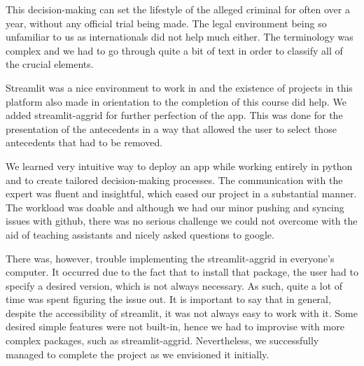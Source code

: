 \documentclass{article}
\begin{document}
This decision-making can set the lifestyle of the alleged criminal for often over a year, without any official trial being made. The legal environment being so unfamiliar to us as internationals did not help much either. The terminology was complex and we had to go through quite a bit of text in order to classify all of the crucial elements.

Streamlit was a nice environment to work in and the existence of projects in this platform also made in orientation to the completion of this course did help. We added streamlit-aggrid for further perfection of the app. This was done for the presentation of the antecedents in a  way that allowed the user to select those antecedents that had to be removed.  %

We learned very intuitive way to deploy an app while working entirely in python and to create tailored decision-making processes. The communication with the expert was fluent and insightful, which eased our project in a substantial manner. The workload was doable and although we had our minor pushing and syncing issues with github, there was no serious challenge we could not overcome with the aid of teaching assistants and nicely asked questions to google.

There was, however, trouble implementing the streamlit-aggrid in everyone's computer. It occurred due to the fact that to install that package, the user had to specify a desired version, which is not always necessary. As such, quite a lot of time was spent figuring the issue out. It is important to say that in general, despite the accessibility of streamlit, it was not always easy to work with it. Some desired simple features were not built-in, hence we had to improvise with more complex packages, such as streamlit-aggrid. Nevertheless, we successfully managed to complete the project as we envisioned it initially. 


\printbibliography
\end{document}
